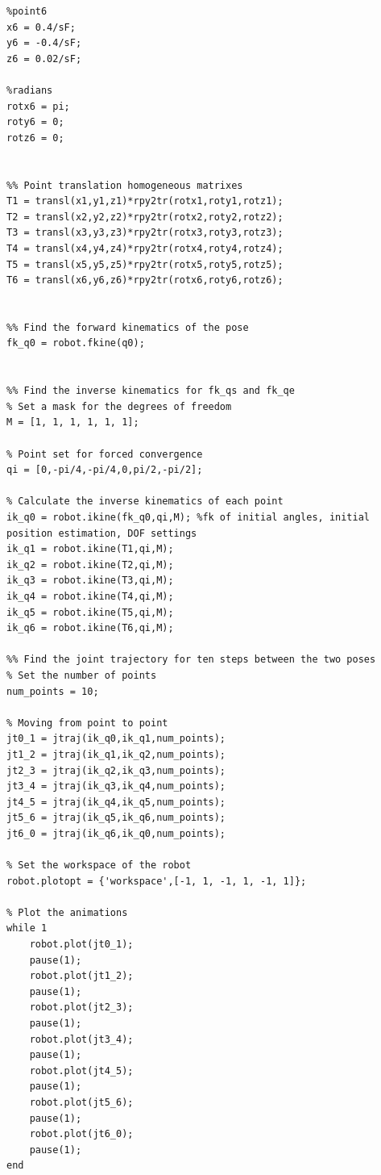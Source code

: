 \documentclass[11pt,a4paper]{report}
\begin{document}
\begin{lstlisting}
%point6
x6 = 0.4/sF;
y6 = -0.4/sF;
z6 = 0.02/sF;

%radians
rotx6 = pi;
roty6 = 0;
rotz6 = 0;


%% Point translation homogeneous matrixes
T1 = transl(x1,y1,z1)*rpy2tr(rotx1,roty1,rotz1);
T2 = transl(x2,y2,z2)*rpy2tr(rotx2,roty2,rotz2);
T3 = transl(x3,y3,z3)*rpy2tr(rotx3,roty3,rotz3);
T4 = transl(x4,y4,z4)*rpy2tr(rotx4,roty4,rotz4);
T5 = transl(x5,y5,z5)*rpy2tr(rotx5,roty5,rotz5);
T6 = transl(x6,y6,z6)*rpy2tr(rotx6,roty6,rotz6);


%% Find the forward kinematics of the pose
fk_q0 = robot.fkine(q0);


%% Find the inverse kinematics for fk_qs and fk_qe
% Set a mask for the degrees of freedom
M = [1, 1, 1, 1, 1, 1];

% Point set for forced convergence
qi = [0,-pi/4,-pi/4,0,pi/2,-pi/2];

% Calculate the inverse kinematics of each point
ik_q0 = robot.ikine(fk_q0,qi,M); %fk of initial angles, initial position estimation, DOF settings
ik_q1 = robot.ikine(T1,qi,M);
ik_q2 = robot.ikine(T2,qi,M);
ik_q3 = robot.ikine(T3,qi,M);
ik_q4 = robot.ikine(T4,qi,M);
ik_q5 = robot.ikine(T5,qi,M);
ik_q6 = robot.ikine(T6,qi,M);

%% Find the joint trajectory for ten steps between the two poses
% Set the number of points
num_points = 10;

% Moving from point to point
jt0_1 = jtraj(ik_q0,ik_q1,num_points);
jt1_2 = jtraj(ik_q1,ik_q2,num_points);
jt2_3 = jtraj(ik_q2,ik_q3,num_points);
jt3_4 = jtraj(ik_q3,ik_q4,num_points);
jt4_5 = jtraj(ik_q4,ik_q5,num_points);
jt5_6 = jtraj(ik_q5,ik_q6,num_points);
jt6_0 = jtraj(ik_q6,ik_q0,num_points);

% Set the workspace of the robot
robot.plotopt = {'workspace',[-1, 1, -1, 1, -1, 1]};

% Plot the animations
while 1
	robot.plot(jt0_1);
	pause(1);
	robot.plot(jt1_2);
	pause(1);
	robot.plot(jt2_3);
	pause(1);
	robot.plot(jt3_4);
	pause(1);
	robot.plot(jt4_5);
	pause(1);
	robot.plot(jt5_6);
	pause(1);
	robot.plot(jt6_0);
	pause(1);
end
\end{lstlisting}
\end{document}
